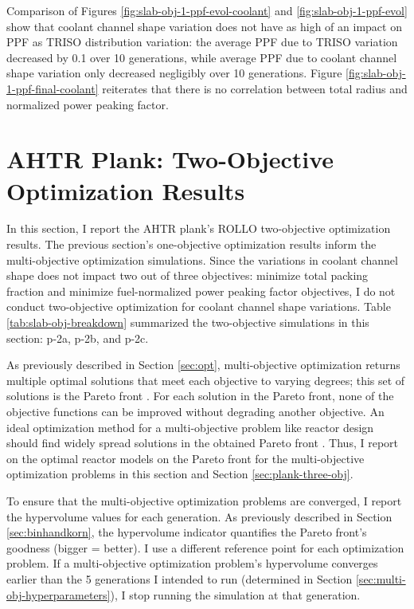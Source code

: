 Comparison of Figures \ref{fig:slab-obj-1-ppf-evol-coolant} and 
\ref{fig:slab-obj-1-ppf-evol} show that coolant channel shape variation 
does not have as high of an impact on PPF as \gls{TRISO} distribution variation:  
the average PPF due to \gls{TRISO} variation decreased by 0.1 over 10 generations, 
while average PPF due to coolant channel shape variation only decreased negligibly
over 10 generations. 
Figure \ref{fig:slab-obj-1-ppf-final-coolant} reiterates that there is no correlation 
between total radius and normalized power peaking factor. 

\pagebreak
\section{AHTR Plank: Two-Objective Optimization Results}
In this section, I report the \gls{AHTR} plank's \gls{ROLLO} two-objective 
optimization results. 
The previous section's one-objective optimization results inform the multi-objective 
optimization simulations.
Since the variations in coolant channel shape does not impact two out of three objectives: 
minimize total packing fraction and minimize fuel-normalized power peaking factor 
objectives, I do not conduct two-objective optimization for coolant channel shape 
variations.  
Table \ref{tab:slab-obj-breakdown} summarized the two-objective simulations in this 
section: p-2a, p-2b, and p-2c.

As previously described in Section \ref{sec:opt}, multi-objective optimization returns 
multiple optimal solutions that meet each objective to varying degrees; this set of 
solutions is the Pareto front \cite{deb_multi-objective_2001}. 
For each solution in the Pareto front, none of the objective functions can be 
improved without degrading another objective.
An ideal optimization method for a multi-objective problem like reactor design 
should find widely spread solutions in the obtained Pareto front 
\cite{deb_multi-objective_2001}. 
Thus, I report on the optimal reactor models on the Pareto front for the multi-objective 
optimization problems in this section and Section \ref{sec:plank-three-obj}. 

To ensure that the multi-objective optimization problems are converged, I report the 
hypervolume values for each generation. 
As previously described in Section \ref{sec:binhandkorn}, the hypervolume indicator 
quantifies the Pareto front's goodness (bigger = better).
I use a different reference point for each optimization problem. 
If a multi-objective optimization problem's hypervolume converges earlier than the 
5 generations I intended to run (determined in Section 
\ref{sec:multi-obj-hyperparameters}), I stop running the simulation at that generation. 


